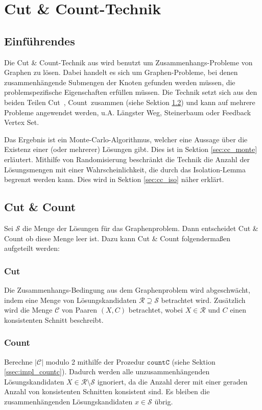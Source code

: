 \chapter{Cut \& Count-Technik}
\label{c:cc_general}

\section{Einführendes}
\label{sec:cc_intro}
Die Cut \& Count-Technik aus \cite{cygan_solving_2011} wird benutzt um Zusammenhangs-Probleme von Graphen zu lösen.
Dabei handelt es sich um Graphen-Probleme, bei denen zusammenhängende Submengen der Knoten gefunden werden müssen, die problemspezifische  Eigenschaften erfüllen müssen. 
Die Technik setzt sich aus den beiden Teilen \glqq Cut\grqq ~, \glqq Count\grqq ~zusammen (siehe Sektion \ref{sec:cc_cc}) und kann auf mehrere Probleme angewendet werden, u.A. Längster Weg, Steinerbaum oder Feedback Vertex Set.

Das Ergebnis ist ein Monte-Carlo-Algorithmus, welcher eine Aussage über die Existenz einer (oder mehrerer) Lösungen gibt. Dies ist in Sektion \ref{sec:cc_monte} erläutert.
Mithilfe von Randomisierung beschränkt die Technik die Anzahl der Lösungsmengen mit einer Wahrscheinlichkeit, die durch das Isolation-Lemma begrenzt werden kann. Dies wird in Sektion \ref{sec:cc_iso} näher erklärt.


\section{Cut \& Count}
\label{sec:cc_cc}
Sei $\mathcal{S}$ die Menge der Lösungen für das Graphenproblem. 
Dann entscheidet Cut \& Count ob diese Menge leer ist. 
Dazu kann Cut \& Count folgendermaßen aufgeteilt werden:

\subsection{Cut}
\label{ssec:cc_cut}
Die Zusammenhangs-Bedingung aus dem Graphenproblem wird abgeschwächt, indem eine Menge von Lösungskandidaten $\mathcal{R} \supseteq \mathcal{S}$ betrachtet wird. 
Zusätzlich wird die Menge $\mathcal{C}$ von Paaren $(X,C)$ betrachtet, wobei $X \in \mathcal{R}$ und $C$ einen konsistenten Schnitt beschreibt. 

\subsection{Count}
\label{ssec:cc_count}
Berechne $|\mathcal{C}|$ modulo 2 mithilfe der Prozedur $\mathtt{countC}$ (siehe Sektion \ref{ssec:impl_countc}). 
Dadurch werden alle unzusammenhängenden Lösungskandidaten $X \in \mathcal{R} \setminus \mathcal{S}$ ignoriert, da die Anzahl derer mit einer geraden Anzahl von konsistenten Schnitten konsistent sind. Es bleiben die zusammenhängenden Lösungskandidaten $x \in \mathcal{S}$ übrig. 

